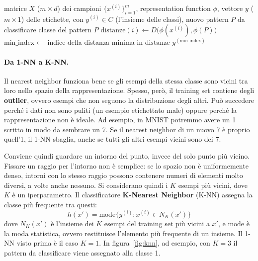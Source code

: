 \begin{algorithm}[htbp]
\caption{Classificazione 1-NN}\label{alg:1nn}
\begin{algorithmic}[1]
\Require matrice $X$ ($m \times d$) dei campioni $\{x^{(i)}\}_{i=1}^m$, representation function $\phi$, vettore $y$ ($m \times 1$) delle etichette, con $y^{(i)} \in C$ (l'insieme delle classi), nuovo pattern $P$ da classificare
\Ensure classe del pattern $P$
    \State $\mathrm{distanze}(i) \gets D\big(\phi(x^{(i)}), \phi(P)\big)$
\EndFor
\State $\mathrm{min\_index} \gets$ indice della distanza minima in $\mathrm{distanze}$
\State \Return $y^{(\mathrm{min\_index})}$
\end{algorithmic}
\end{algorithm}

\paragraph{Da 1-NN a K-NN.}
Il nearest neighbor funziona bene se gli esempi della stessa classe sono vicini tra loro nello spazio della rappresentazione. Spesso, però, il training set contiene degli \textbf{outlier}, ovvero esempi che non seguono la distribuzione degli altri. Può succedere perché i dati non sono puliti (un esempio etichettato male) oppure perché la rappresentazione non è ideale. Ad esempio, in MNIST potremmo avere un 1 scritto in modo da sembrare un 7. Se il nearest neighbor di un nuovo 7 è proprio quell'1, il 1-NN sbaglia, anche se tutti gli altri esempi vicini sono dei 7.

Conviene quindi guardare un intorno del punto, invece del solo punto più vicino. Fissare un raggio per l'intorno non è semplice: se lo spazio non è uniformemente denso, intorni con lo stesso raggio possono contenere numeri di elementi molto diversi, a volte anche nessuno. Si considerano quindi i $K$ esempi più vicini, dove $K$ è un iperparametro. Il classificatore \textbf{K-Nearest Neighbor} (K-NN) assegna la classe più frequente tra questi:
\[
h(x') = \mathrm{mode}\big\{y^{(i)} : x^{(i)} \in N_K(x')\big\}
\]
dove $N_K(x')$ è l'insieme dei $K$ esempi del training set più vicini a $x'$, e $\mathrm{mode}$ è la moda statistica, ovvero restituisce l'elemento più frequente di un insieme. Il 1-NN visto prima è il caso $K = 1$. In figura~\ref{fig:knn}, ad esempio, con $K = 3$ il pattern da classificare viene assegnato alla classe 1.

